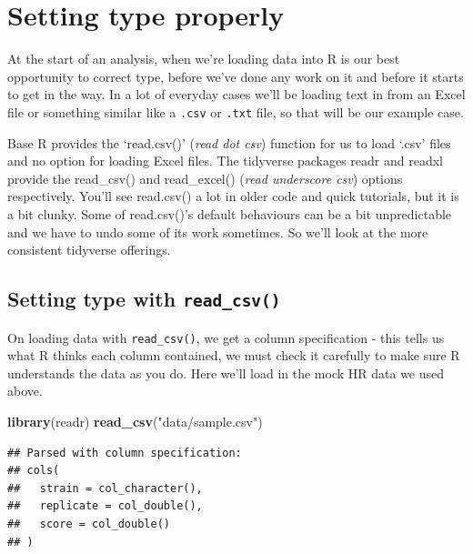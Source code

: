 \documentclass[
]{book}
\newenvironment{Shaded}{\begin{snugshade}}{\end{snugshade}}
\newcommand{\KeywordTok}[1]{\textcolor[rgb]{0.13,0.29,0.53}{\textbf{#1}}}
\newcommand{\NormalTok}[1]{#1}
\newcommand{\StringTok}[1]{\textcolor[rgb]{0.31,0.60,0.02}{#1}}
\newenvironment{sidenote}
{ \begin{tcolorbox}[colbacktitle=blue!50!white,
title=huh?,coltitle=white,
fonttitle=\bfseries] }
{  \end{tcolorbox} }
\begin{document}
\hypertarget{setting-type-properly}{%
\section{Setting type properly}\label{setting-type-properly}}

At the start of an analysis, when we're loading data into R is our best opportunity to correct type, before we've done any work on it and before it starts to get in the way. In a lot of everyday cases we'll be loading text in from an Excel file or something similar like a \texttt{.csv} or \texttt{.txt} file, so that will be our example case.

\begin{sidenote}
Base R provides the `read.csv()' (\emph{read dot csv}) function for us to load `.csv' files and no option for loading Excel files. The tidyverse packages readr and readxl provide the read\_csv() and read\_excel() (\emph{read underscore csv}) options respectively. You'll see read.csv() a lot in older code and quick tutorials, but it is a bit clunky. Some of read.csv()'s default behaviours can be a bit unpredictable and we have to undo some of its work sometimes. So we'll look at the more consistent tidyverse offerings.
\end{sidenote}

\hypertarget{setting-type-with-read_csv}{%
\subsection{\texorpdfstring{Setting type with \texttt{read\_csv()}}{Setting type with read\_csv()}}\label{setting-type-with-read_csv}}

On loading data with \texttt{read\_csv()}, we get a column specification - this tells us what R thinks each column contained, we must check it carefully to make sure R understands the data as you do. Here we'll load in the mock HR data we used above.

\begin{Shaded}
\begin{Highlighting}[]
\KeywordTok{library}\NormalTok{(readr)}
\KeywordTok{read_csv}\NormalTok{(}\StringTok{"data/sample.csv"}\NormalTok{)}
\end{Highlighting}
\end{Shaded}

\begin{verbatim}
## Parsed with column specification:
## cols(
##   strain = col_character(),
##   replicate = col_double(),
##   score = col_double()
## )
\end{verbatim}
\end{document}
